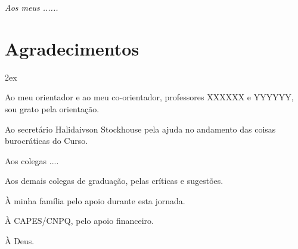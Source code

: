 \begin{titlepage}

\vspace*{\fill}

\hfill
\begin{minipage}{0.5\linewidth}
\begin{flushright}
\large\it
Aos meus ......
\end{flushright}
\end{minipage}

\vspace*{\fill}

\end{titlepage}

%
%


\chapter*{Agradecimentos}
\thispagestyle{empty}

\begin{trivlist}  \itemsep 2ex

\item Ao meu orientador e ao meu co-orientador, professores XXXXXX e YYYYYY, sou grato pela orientação.

\item Ao secretário Halidaivson Stockhouse pela ajuda no andamento das coisas burocráticas do Curso.

\item Aos colegas ....

\item Aos demais colegas de graduação, pelas críticas e sugestões.

\item À minha família pelo apoio durante esta jornada.

\item À CAPES/CNPQ, pelo apoio financeiro.

\item À Deus.

\end{trivlist}

